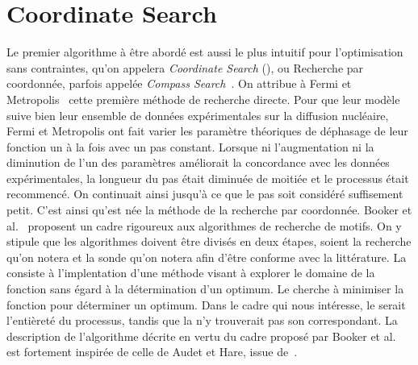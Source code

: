\section{Coordinate Search}\label{sec:cs}
Le premier algorithme à être abordé est aussi le plus intuitif pour l'optimisation sans contraintes, qu'on appelera \emph{Coordinate Search} (\CS{}), ou Recherche par coordonnée, parfois appelée \emph{Compass Search}~\cite{KoLeTo03a}. On attribue à Fermi et Metropolis~\cite{FeMe1952} cette première méthode de recherche directe. Pour que leur modèle suive bien leur ensemble de données expérimentales sur la diffusion nucléaire, Fermi et Metropolis ont fait varier les paramètre théoriques de déphasage de leur fonction un à la fois avec un pas constant. Lorsque ni l'augmentation ni la diminution de l'un des paramètres améliorait la concordance avec les données expérimentales, la longueur du pas était diminuée de moitiée et le processus était recommencé. On continuait ainsi jusqu'à ce que le pas soit considéré suffisement petit. C'est ainsi qu'est née la méthode de la recherche par coordonnée. 
Booker et al.~\cite{BoDeFrSeToTr99a} proposent un cadre rigoureux aux algorithmes de recherche de motifs. On y stipule que les algorithmes doivent être divisés en deux étapes, soient la recherche qu'on notera \SEARCH{} et la sonde qu'on notera \POLL{} afin d'être conforme avec la littérature. La \SEARCH{} consiste à l'implentation d'une méthode visant à explorer le domaine de la fonction sans égard à la détermination d'un optimum. Le \POLL{} cherche à minimiser la fonction pour déterminer un optimum. Dans le cadre qui nous intéresse, le \POLL{} serait l'entièreté du processus, tandis que la \SEARCH{} n'y trouverait pas son correspondant. La description de l'algorithme \CS{} décrite en vertu du cadre proposé par Booker et al. est fortement inspirée de celle de Audet et Hare, issue de~\cite{AuHa2018}.
